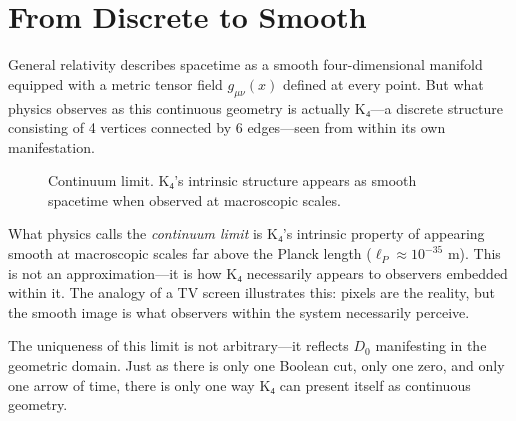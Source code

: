 \documentclass[11pt,a4paper]{book}
\begin{document}
\section{From Discrete to Smooth}

General relativity describes spacetime as a smooth four-dimensional manifold equipped with a metric 
tensor field $g_{\mu\nu}(x)$ defined at every point. But what physics observes as this continuous 
geometry is actually K₄—a discrete structure consisting of 4 vertices connected by 6 edges—seen 
from within its own manifestation.

\begin{figure}[h]
\centering
{}
\caption{Continuum limit. K₄'s intrinsic structure appears as smooth spacetime when observed at macroscopic scales.}
\label{fig:continuum-holographic}
\end{figure}

What physics calls the \emph{continuum limit} is K₄'s intrinsic property of appearing smooth 
at macroscopic scales far above the Planck length ($\ell_P \approx 10^{-35}$ m). This is not 
an approximation—it is how K₄ necessarily appears to observers embedded within it. The analogy 
of a TV screen illustrates this: pixels are the reality, but the smooth image is what observers 
within the system necessarily perceive.

The uniqueness of this limit is not arbitrary—it reflects $D_0$ manifesting in the 
geometric domain. Just as there is only one Boolean cut, only one zero, and only one arrow 
of time, there is only one way K₄ can present itself as continuous geometry.
\end{document}
